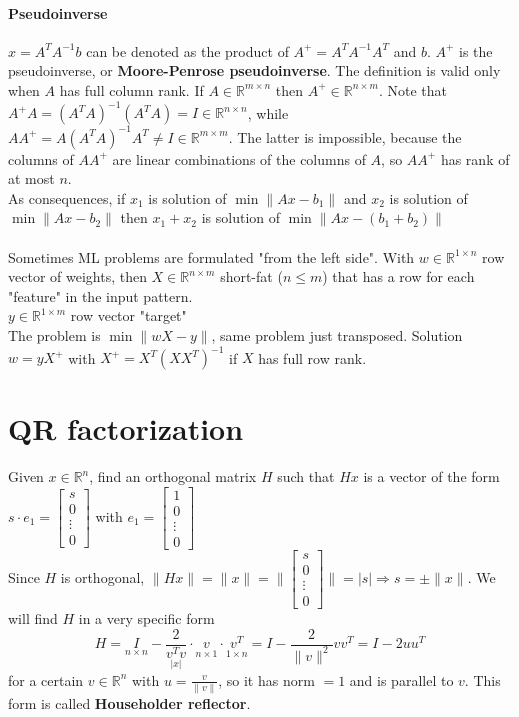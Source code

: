 \documentclass[10pt]{report}
\begin{document}
\paragraph{Pseudoinverse} $x = A^TA^{-1}b$ can be denoted as the product of $A^+ = A^TA^{-1}A^T$ and $b$. $A^+$ is the pseudoinverse, or \textbf{Moore-Penrose pseudoinverse}. The definition is valid only when $A$ has full column rank. If $A\in \mathbb{R}^{m\times n}$ then $A^+ \in \mathbb{R}^{n\times m}$. Note that $A^+A = (A^TA)^{-1}(A^TA) = I\in \mathbb{R}^{n\times n}$, while $AA^+ = A(A^TA)^{-1}A^T \neq I\in \mathbb{R}^{m\times m}$. The latter is impossible, because the columns of $AA^+$ are linear combinations of the columns of $A$, so $AA^+$ has rank of at most $n$.\\
As consequences, if $x_1$ is solution of $\min\|Ax - b_1\|$ and $x_2$ is solution of $\min\|Ax - b_2\|$ then $x_1+x_2$ is solution of $\min\|Ax - (b_1 + b_2)\|$\\\\Sometimes ML problems are formulated "from the left side". With $w\in \mathbb{R}^{1\times n}$ row vector of weights, then $X\in \mathbb{R}^{n\times m}$ short-fat ($n\leq m$) that has a row for each "feature" in the input pattern.\\
$y \in \mathbb{R}^{1\times m}$ row vector "target"\\
The problem is $\min\|wX - y\|$, same problem just transposed. Solution $w = yX^+$ with $X^+ = X^T(XX^T)^{-1}$ if $X$ has full row rank.
\section{QR factorization} Given $x\in \mathbb{R}^n$, find an orthogonal matrix $H$ such that $Hx$ is a vector of the form $s\cdot e_1 = \left[\begin{array}{c}
s\\0\\\vdots\\0
\end{array}\right]$ with $e_1 = \left[\begin{array}{c}
1\\0\\\vdots\\0
\end{array}\right]$\\
Since $H$ is orthogonal, $\|Hx\| = \|x\| = \|\left[\begin{array}{c}
s\\0\\\vdots\\0
\end{array}\right]\| = |s| \Rightarrow s = \pm\|x\|$. We will find $H$ in a very specific form $$H = \underset{n\times n}{I} - \underset{|x|}{\frac{2}{v^Tv}}\cdot\underset{n\times 1}{v}\cdot\underset{1\times n}{v^T}= I - \frac{2}{\|v\|^2}vv^T = I - 2uu^T$$ for a certain $v\in \mathbb{R}^n$ with $u = \frac{v}{\|v\|}$, so it has norm $=1$ and is parallel to $v$. This form is called \textbf{Householder reflector}.
\end{document}
